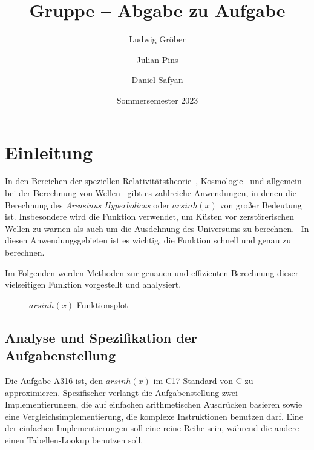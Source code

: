 \documentclass[course=erap] {aspdoc}
\author{Ludwig Gröber \and Julian Pins \and Daniel Safyan}
\date{Sommersemester 2023} %
\title{Gruppe \theGroup{} -- Abgabe zu Aufgabe \theNumber}
\begin{document}
    \maketitle


    \section{Einleitung}\label{sec:einleitung}

    In den Bereichen der speziellen Relativitätstheorie~\cite{relativity}, Kosmologie~\cite{universum1,universum2} und allgemein bei der Berechnung von Wellen~\cite{linear_waves} gibt es zahlreiche Anwendungen, in denen die Berechnung des \textit{Areasinus Hyperbolicus} oder $arsinh(x)$ von großer Bedeutung ist.
    Insbesondere wird die Funktion verwendet, um Küsten vor zerstörerischen Wellen zu warnen als auch um die Ausdehnung des Universums zu berechnen.~\cite{universum1,universum2}
    In diesen Anwendungsgebieten ist es wichtig, die Funktion schnell und genau zu berechnen.

    Im Folgenden werden Methoden zur genauen und effizienten Berechnung dieser vielseitigen Funktion vorgestellt und analysiert.
    \begin{figure}[h]
        \caption{$arsinh(x)$-Funktionsplot}
    \end{figure}

    \subsection{Analyse und Spezifikation der Aufgabenstellung}\label{subsec:analyse-und-spezifikation-der-aufgabenstellung}

    Die Aufgabe A316 ist, den $arsinh(x)$ im C17 Standard von C zu approximieren.
    Spezifischer verlangt die Aufgabenstellung zwei Implementierungen, die auf einfachen arithmetischen Ausdrücken basieren sowie eine Vergleichsimplementierung, die komplexe Instruktionen benutzen darf.
    Eine der einfachen Implementierungen soll eine reine Reihe sein, während die andere einen Tabellen-Lookup benutzen soll.
\end{document}
